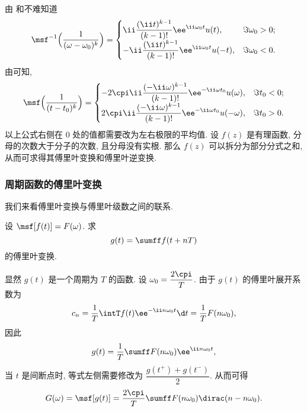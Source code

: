 由 和\thmFSim 不难知道
\begin{equation}
  \label{eq:fourier-inverse-transform-rational-function}
  \msf^{-1}\Bigl(\frac1{(\omega-\omega_0)^k}\Bigr)
  =\begin{cases}
    \ii\dfrac{(\ii t)^{k-1}}{(k-1)!}\ee^{\ii \omega_0 t} u(t),
    &\Im\omega_0>0;\\
    -\ii\dfrac{(\ii t)^{k-1}}{(k-1)!}\ee^{\ii \omega_0 t} u(-t),
    &\Im\omega_0<0.
  \end{cases}
\end{equation}
由\thmFSym 可知,
\begin{equation}
  \label{eq:fourier-transform-rational-function}
  \msf\Bigl(\frac1{(t-t_0)^k}\Bigr)
  =\begin{cases}
    -2\cpi\ii\dfrac{(-\ii \omega)^{k-1}}{(k-1)!}\ee^{-\ii \omega t_0} u(\omega),
    &\Im t_0<0;\\
    2\cpi\ii\dfrac{(-\ii \omega)^{k-1}}{(k-1)!}\ee^{-\ii \omega t_0} u(-\omega),
    &\Im t_0>0.
  \end{cases}
\end{equation}
以上公式右侧在 $0$ 处的值都需要改为左右极限的平均值.
设 $f(z)$ 是有理函数, 分母的次数大于分子的次数, 且分母没有实根.
那么 $f(z)$ 可以拆分为部分分式之和, 从而可求得其傅里叶变换和傅里叶逆变换.


\subsubsection{周期函数的傅里叶变换}

我们来看傅里叶变换与傅里叶级数之间的联系.

\begin{example}
  \label{exam:fourier-transform-period-function}
  设 $\msf[f(t)]=F(\omega)$. 求
  \[
    g(t)=\sumff f(t+nT)
  \]
  的傅里叶变换.
\end{example}

\begin{solution}
  显然 $g(t)$ 是一个周期为 $T$ 的函数.
  设 $\omega_0=\dfrac{2\cpi}T$.
  由于 $g(t)$ 的傅里叶展开系数为
  \[
    c_n=\frac1T\intT f(t)\ee^{-\ii n\omega_0 t}\d t
    =\frac 1TF(n\omega_0),
  \]
  因此
  \[
    g(t)=\frac1T\sumff F(n\omega_0)\ee^{\ii n\omega_0t},
  \]
  当 $t$ 是间断点时, 等式左侧需要修改为 $\dfrac{g(t^+)+g(t^-)}2$.
  从而可得
  \[
    G(\omega)=\msf[g(t)]
    =\frac{2\cpi}T\sumff F(n\omega_0)\dirac(n-n\omega_0).
  \]
\end{solution}

